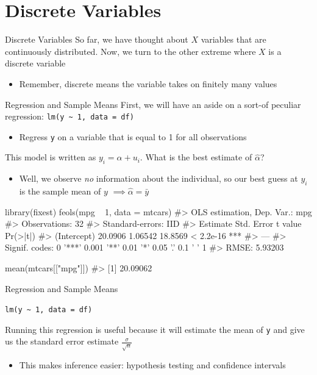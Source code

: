 \documentclass[aspectratio=169,t,11pt,table]{beamer}
\begin{document}
\section{Discrete Variables}

\begin{frame}{Discrete Variables}
  So far, we have thought about $X$ variables that are continuously distributed. Now, we turn to the other extreme where $X$ is a discrete variable
  \begin{itemize}
    \item Remember, \alert{discrete} means the variable takes on finitely many values
  \end{itemize}
\end{frame}

\begin{frame}{Regression and Sample Means}
    First, we will have an aside on a sort-of peculiar regression: 
    \texttt{lm(y \textasciitilde{} 1, data = df)}
    \begin{itemize}
      \item Regress \texttt{y} on a variable that is equal to 1 for all observations
    \end{itemize}

    \pause
    \bigskip
    This model is written as $y_i = \alpha + u_i$. What is the best estimate of $\hat{\alpha}$?
    \begin{itemize}
      \item Well, we observe \emph{no} information about the individual, so our best guess at $y_i$ is the sample mean of $y$ $\implies \hat{\alpha} = \bar{y}$
    \end{itemize} 
\end{frame}

\begin{frame}[fragile]{}
  \begin{codeblock}
library(fixest)
feols(mpg ~ 1, data = mtcars)
#> OLS estimation, Dep. Var.: mpg
#> Observations: 32
#> Standard-errors: IID 
#>             Estimate Std. Error t value  Pr(>|t|)    
#> (Intercept)  20.0906    1.06542 18.8569 < 2.2e-16 ***
#> ---
#> Signif. codes:  0 '***' 0.001 '**' 0.01 '*' 0.05 '.' 0.1 ' ' 1
#> RMSE: 5.93203

mean(mtcars[["mpg"]])
#> [1] 20.09062
  \end{codeblock}
\end{frame}

\begin{frame}{Regression and Sample Means}
  \begin{center}
    \texttt{lm(y \textasciitilde{} 1, data = df)}
  \end{center}

  \bigskip
  Running this regression is useful because it will estimate the mean of \texttt{y} and give us the standard error estimate $\frac{\sigma}{\sqrt{n}}$
  \begin{itemize}
    \item This makes inference easier: hypothesis testing and confidence intervals 
  \end{itemize}
\end{frame}
\end{document}
